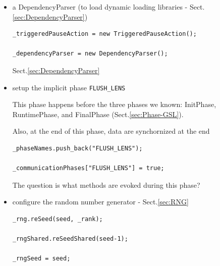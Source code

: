 \begin{itemize}
     \item a DependencyParser (to load dynamic loading libraries - Sect.\ref{sec:DependencyParser})
     

\begin{lstlisting}
_triggeredPauseAction = new TriggeredPauseAction();

_dependencyParser = new DependencyParser();

\end{lstlisting}
Sect.\ref{sec:DependencyParser}

     \item setup the implicit phase \verb!FLUSH_LENS!

\label{sec:Phase_FLUSH_LENS}
This phase happens before the three phases we known: InitPhase, RuntimePhase, and
FinalPhase (Sect.\ref{sec:Phase-GSL}).

Also, at the end of this phase, data are synchornized at the end

\begin{lstlisting}
_phaseNames.push_back("FLUSH_LENS");

_communicationPhases["FLUSH_LENS"] = true;
\end{lstlisting}

The question is what methods are evoked during this phase?

 
      \item  configure the random number generator - Sect.\ref{sec:RNG}

\begin{lstlisting}
_rng.reSeed(seed, _rank);

_rngShared.reSeedShared(seed-1);

_rngSeed = seed;
\end{lstlisting}
\end{itemize}

